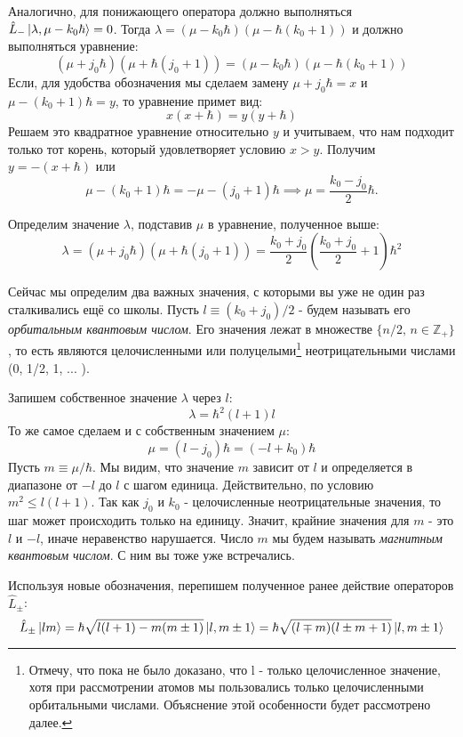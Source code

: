 Аналогично, для понижающего оператора должно выполняться $\hat{L}_-\ket{\lambda,\mu - k_0\hbar} = 0$. Тогда $\lambda = (\mu - k_0\hbar)(\mu-\hbar(k_0 + 1))$ и должно выполняться уравнение:
\[
 (\mu + j_0\hbar)(\mu + \hbar(j_0 + 1))=(\mu - k_0\hbar)(\mu-\hbar(k_0 + 1))
\]
Если, для удобства обозначения мы сделаем замену $\mu + j_0\hbar = x$ и $\mu - (k_0 + 1)\hbar = y$, то уравнение примет вид:
\[
x(x+\hbar) = y(y+\hbar)
\]
Решаем это квадратное уравнение относительно $y$ и учитываем, что нам подходит только тот корень, который удовлетворяет условию $x > y$. Получим $y = -(x + \hbar)$ или 
\[
\mu - (k_0 + 1)\hbar = -\mu - (j_0 + 1)\hbar \implies \mu = \frac{k_0 - j_0}{2}\hbar.
\]

Определим значение $\lambda$, подставив $\mu$ в уравнение, полученное выше:
\[
\lambda = (\mu + j_0\hbar)(\mu + \hbar(j_0+1)) = \frac{k_0 + j_0}{2}\left(\frac{k_0 + j_0}{2} + 1\right)\hbar^2
\]

Сейчас мы определим два важных значения, с которыми вы уже не один раз сталкивались ещё со школы. Пусть $l\equiv (k_0 + j_0)/2$ - будем называть его \textit{орбитальным квантовым числом}. Его значения лежат в множестве $\{n/2,\, n\in \mathbb{Z}_+\}$, то есть являются целочисленными или полуцелыми\footnote[1]{Отмечу, что пока не было доказано, что l - только целочисленное значение, хотя при рассмотрении атомов мы пользовались только целочисленными орбитальными числами. Объяснение этой особенности будет рассмотрено далее.} неотрицательными числами (0, 1/2, 1, ... ).

Запишем собственное значение $\lambda$  через $l$:
\[
\lambda = \hbar^2(l+1)l
\]
То же самое сделаем и с собственным значением $\mu$:
\[
\mu = (l - j_0)\hbar = (-l + k_0)\hbar
\]
Пусть $m \equiv \mu/\hbar$. Мы видим, что значение $m$ зависит от $l$ и определяется в диапазоне от $-l$ до $l$ с шагом единица. Действительно, по условию $m^2 \leq l(l+1)$. Так как $j_0$ и $k_0$ - целочисленные неотрицательные значения, то шаг может происходить только на единицу. Значит, крайние значения для $m$ - это $l$ и $-l$, иначе неравенство нарушается. Число $m$ мы будем называть \textit{магнитным квантовым числом}. С ним вы тоже уже встречались.

Используя новые обозначения, перепишем полученное ранее действие операторов $\hat{L}_{\pm}$:
\[
\hat{L}_{\pm}\ket{lm} = \hbar\sqrt{l(l+1) - m(m \pm 1)}\ket{l, m \pm 1} = \hbar\sqrt{(l \mp m)(l \pm m + 1)}\ket{l,m\pm 1}
\]


